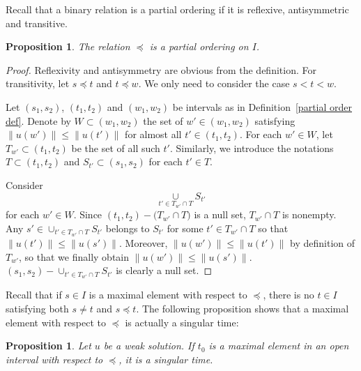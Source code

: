 \documentclass{article}
\newtheorem{prop}[definition]{Proposition}
\begin{document}
Recall that a binary relation is a partial ordering if it is reflexive, antisymmetric and transitive.

\begin{prop}
    The relation $\preceq$ is a partial ordering on $I$.
\end{prop}
\begin{proof}
    Reflexivity and antisymmetry are obvious from the definition. For transitivity, let $s \preceq t$ and $t \preceq w$. We only need to consider the case $s < t < w$. 

   Let $(s_1, s_2)$, $(t_1, t_2)$ and $(w_1, w_2)$ be intervals as in Definition~\ref{partial order def}. Denote by $W \subset (w_1, w_2)$ the set of $w' \in (w_1, w_2)$ satisfying $\lVert u(w') \rVert \leq \lVert u(t') \rVert$ for almost all $t' \in (t_1,t_2)$. For each $w' \in W$, let $T_{w'} \subset (t_1,t_2)$ be the set of all such $t'$. Similarly, we introduce the notations $T \subset (t_1,t_2)$ and $S_{t'} \subset (s_1,s_2)$ for each $t' \in T$.


Consider 
\begin{equation*}
\underset{t' \in T_{w'} \cap T}{\cup}  S_{t'}    
\end{equation*}
for each $w' \in W$. Since $(t_1,t_2) - \bigl( T_{w'} \cap T \bigr)$ is a null set, $T_{w'} \cap T$ is nonempty. Any $s' \in \cup_{t' \in T_{w'} \cap T}  S_{t'}$ belongs to $S_{t'}$ for some $t' \in T_{w'} \cap T$ so that $\lVert u(t') \rVert \leq \lVert u(s') \rVert$. Moreover,  $\lVert u(w') \rVert \leq \lVert u(t') \rVert$ by definition of $T_{w'}$, so that we finally obtain  $\lVert u(w') \rVert \leq \lVert u(s') \rVert$. $(s_1,s_2) - \cup_{t' \in T_{w'} \cap T}  S_{t'}$ is clearly a null set.
\end{proof}





Recall that if $s \in I$ is a maximal element with respect to $\preceq$, there is no $t \in I$ satisfying both $s \neq t$ and $s \preceq t$. The following proposition shows that a maximal element with respect to $\preceq$ is actually a singular time:

\begin{prop}
\label{maxsin}
    Let $u$ be a weak solution. If $t_0$ is a maximal element in an open interval with respect to $\preceq$, it is a singular time.
\end{prop}
\end{document}
